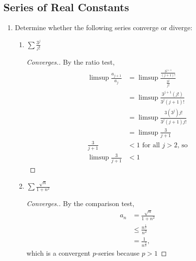 \documentclass{article}
\begin{document}
\subsection{Series of Real Constants}
\begin{enumerate}
      \item Determine whether the following series converge
            or diverge:
            \begin{enumerate}
                  \item $\sum\frac{3^j}{j!}$
                        \begin{proof}[Converges.]
                              By the ratio test,
                              \begin{align*}
                                    \limsup \frac{a_{j+1}}{a_j} & = \limsup \frac{\frac{3^{j+1}}{(j+1)!}}{\frac{3^j}{j!}} \\
                                                                & = \limsup \frac{3^{j+1}(j!)}{3^j(j+1)!}                 \\
                                                                & = \limsup \frac{3(3^j)j!}{3^j(j+1)j!}                   \\
                                                                & = \limsup \frac{3}{j+1}                                 \\
                                    \frac{3}{j+1}               & < 1 \textrm{ for all $j>2$, so}                         \\
                                    \limsup \frac{3}{j+1}       & < 1
                              \end{align*}
                        \end{proof}
                  \item $\sum\frac{\sqrt{n}}{1+n^2}$
                        \begin{proof}[Converges.]
                              By the comparison test,
                              \begin{align*}
                                    a_n & = \frac{\sqrt{n}}{1+n^2}       \\
                                        & \leq \frac{n^\frac{1}{2}}{n^2} \\
                                        & = \frac{1}{n^\frac{3}{2}},
                              \end{align*}
                              which is a convergent $p$-series because $p>1$
                        \end{proof}

\end{enumerate}
\end{enumerate}
\end{document}
